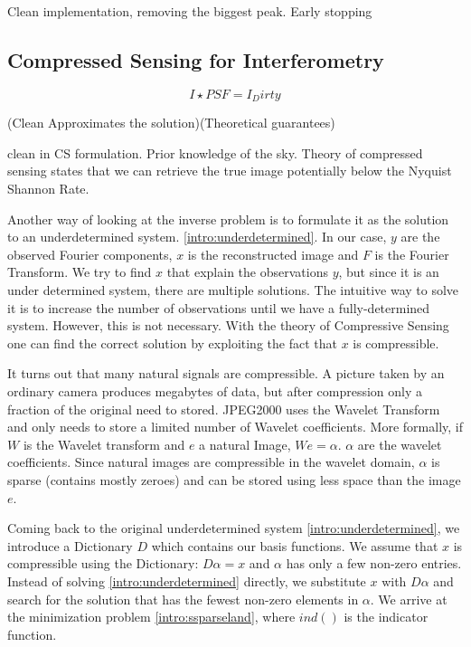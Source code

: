 Clean implementation, removing the biggest peak. Early stopping


\subsection{Compressed Sensing for Interferometry}

\begin{equation}\label{intro:deconvolution}
I \star PSF = I_Dirty
\end{equation}

(Clean Approximates the solution)(Theoretical guarantees)

clean in CS formulation. Prior knowledge of the sky. Theory of compressed sensing states that we can retrieve the true image potentially below the Nyquist Shannon Rate.

Another way of looking at the inverse problem is to formulate it as the solution to an underdetermined system. \eqref{intro:underdetermined}. In our case, $y$ are the observed Fourier components, $x$ is the reconstructed image and $F$ is the Fourier Transform. We try to find $x$ that explain the observations $y$, but since it is an under determined system, there are multiple solutions. The intuitive way to solve it is to increase the number of observations until we have a fully-determined system. However, this is not necessary. With the theory of Compressive Sensing one can find the correct solution by exploiting the fact that $x$ is compressible.

It turns out that many natural signals are compressible. A picture taken by an ordinary camera produces megabytes of data, but after compression only a fraction of the original need to stored. JPEG2000 uses the Wavelet Transform and only needs to store a limited number of Wavelet coefficients. More formally, if $W$ is the Wavelet transform and $e$ a natural Image, $We = \alpha$. $\alpha$ are the wavelet coefficients. Since natural images are compressible in the wavelet domain, $\alpha$ is sparse (contains mostly zeroes) and can be stored using less space than the image $e$.

Coming back to the original underdetermined system \eqref{intro:underdetermined}, we introduce a Dictionary $D$ which contains our basis functions. We assume that $x$ is compressible using the Dictionary: $D\alpha = x$ and $\alpha$ has only a few non-zero entries. Instead of solving \eqref{intro:underdetermined} directly, we substitute $x$ with $D\alpha$ and search for the solution that has the fewest non-zero elements in $\alpha$. We arrive at the minimization problem \eqref{intro:ssparseland}, where $\mathit{ind}()$ is the indicator function. 

